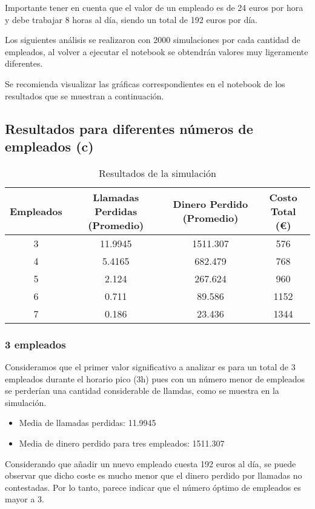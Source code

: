 \documentclass{article}
\begin{document}
Importante tener en cuenta que el valor de un empleado es de 24 euros por hora y debe trabajar 8 horas al día, siendo un total de 192 euros por día.

Los siguientes análisis se realizaron con 2000 simulaciones por cada cantidad de empleados, al volver a ejecutar el notebook se obtendrán valores muy ligeramente diferentes.

Se recomienda visualizar las gráficas correspondientes en el notebook de los resultados que se muestran a continuación.
\subsection*{Resultados para diferentes números de empleados (c)}


\begin{table}[H]
    \centering
    \caption{Resultados de la simulación}
    \begin{tabular}{cccc}
        \toprule
        Empleados & Llamadas Perdidas (Promedio) & Dinero Perdido (Promedio) & Costo Total (€) \\
        \midrule
        3 & 11.9945 & 1511.307 & 576 \\
        4 & 5.4165 & 682.479 & 768 \\
        5 & 2.124 & 267.624 & 960 \\
        6 & 0.711 & 89.586 & 1152 \\
        7 & 0.186 & 23.436 & 1344 \\
        \bottomrule
    \end{tabular}
\end{table}
\subsubsection*{3 empleados}

Consideramos que el primer valor significativo a analizar es para un total de 3 empleados durante el horario pico (3h) pues con un número menor de empleados se perderían una cantidad considerable de llamdas, como se muestra en la simulación.
\begin{itemize}
    \item Media de llamadas perdidas: 11.9945
    \item Media de dinero perdido para tres empleados: 1511.307
\end{itemize}

Considerando que añadir un nuevo empleado cuesta 192 euros al día, se puede observar que dicho coste es mucho menor que el dinero perdido por llamadas no contestadas. Por lo tanto, parece indicar que el número óptimo de empleados es mayor a 3.
\end{document}
